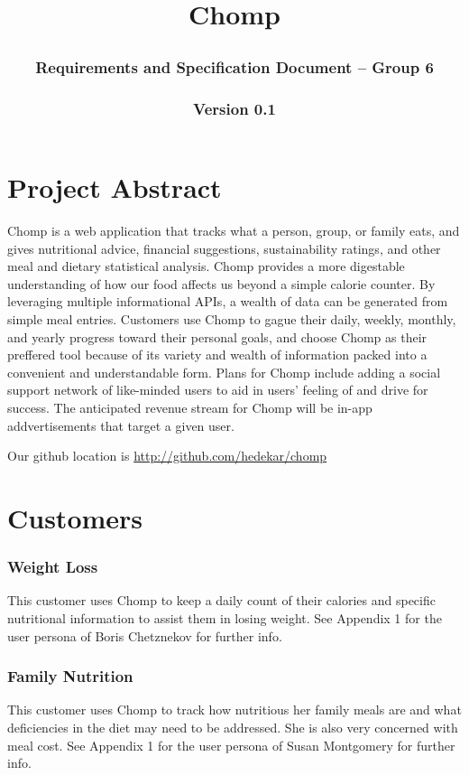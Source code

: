 \documentclass[a4paper,12pt]{article}
\begin{document}
\title{Chomp
\subsubsection*{Requirements and Specification Document -- Group 6}\subsubsection*{Version 0.1}
}\maketitle
\section*{Project Abstract}
Chomp is a web application that tracks what a person, group, or family eats, and gives nutritional advice, financial suggestions, sustainability ratings, and other meal and dietary statistical analysis.  Chomp provides a more digestable understanding of how our food affects us beyond a simple calorie counter.  By leveraging multiple informational APIs, a wealth of data can be generated from simple meal entries.  Customers use Chomp to gague their daily, weekly, monthly, and yearly progress toward their personal goals, and choose Chomp as their preffered tool because of its variety and wealth of information packed into a convenient and understandable form.  Plans for Chomp include adding a social support network of like-minded users to aid in users' feeling of and drive for success.  The anticipated revenue stream for Chomp will be in-app addvertisements that target a given user.

Our github location is \url{http://github.com/hedekar/chomp}
\section*{Customers}
\subsubsection*{Weight Loss}
This customer uses Chomp to keep a daily count of their calories and specific nutritional information to assist them in losing weight.  See Appendix 1 for the user persona of Boris Chetznekov for further info.
\subsubsection*{Family Nutrition}
This customer uses Chomp to track how nutritious her family meals are and what deficiencies in the diet may need to be addressed.  She is also very concerned with meal cost.  See Appendix 1 for the user persona of Susan Montgomery for further info.
\end{document}
